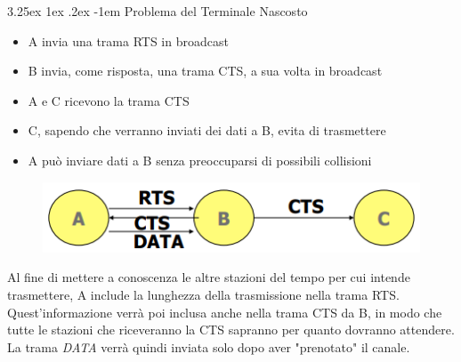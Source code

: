 \documentclass{article}
\makeatletter
\renewcommand\paragraph{\@startsection{paragraph}{5}{\z@}%
  {3.25ex \@plus1ex \@minus.2ex}%
  {-1em}%
  {\normalfont\normalsize\bfseries}}
\makeatother
\begin{document}
                    \paragraph{Problema del Terminale Nascosto}
                        \begin{itemize}
                            \item A invia una trama RTS in broadcast
                            \item B invia, come risposta, una trama CTS, a sua volta in broadcast
                            \item A e C ricevono la trama CTS
                            \item C, sapendo che verranno inviati dei dati a B, evita di trasmettere
                            \item A può inviare dati a B senza preoccuparsi di possibili collisioni 
                        \end{itemize}
                        \begin{figure}[H]
                            \centering
                            \includegraphics[width=\textwidth]{pic/nascosto_cts_rts.png}
                            \label{Soluzione al Terminale Nascosto con RTS/CTS}
                        \end{figure}
                        Al fine di mettere a conoscenza le altre stazioni del tempo per cui intende trasmettere, A include la lunghezza della trasmissione nella trama RTS. Quest'informazione verrà poi inclusa anche nella trama CTS da B, in modo che tutte le stazioni che riceveranno la CTS sapranno per quanto dovranno attendere. La trama \textit{DATA} verrà quindi inviata solo dopo aver "prenotato" il canale.
\end{document}
